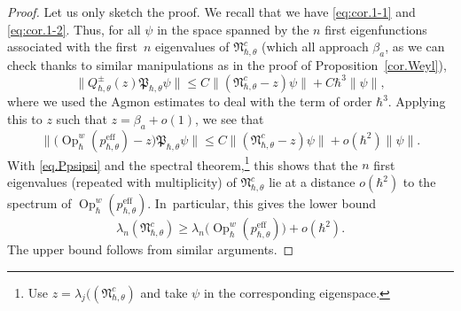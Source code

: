 \documentclass[JEP,XML,SOM,Unicode,NoFloatCountersInSection,published]{cedram}
\newcommand{\eff}{\mathrm{eff}}
\DeclareMathOperator{\Op}{Op}
\theoremstyle{plain}
\theoremstyle{definition}
\begin{document}
\begin{proof}
Let us only sketch the proof. We recall that we have \eqref{eq:cor.1-1} and \eqref{eq:cor.1-2}. Thus, for all $\psi$ in the space spanned by the $n$ first eigenfunctions associated with the first~$n$ eigenvalues of $\mathfrak{N}^c_{\hbar,\theta}$ (which all approach $\beta_a$, as we can check thanks to similar manipulations as in the proof of Proposition~\ref{cor.Weyl}),
\[
\|Q_{\hbar,\theta}^\pm(z)\mathfrak{P}_{\hbar,\theta}\psi\|\leq C\|(\mathfrak{N}_{\hbar,\theta}^c-z)\psi\|+C\hbar^3\|\psi\|,
\]
where we used the Agmon estimates to deal with the term of order $\hbar^3$. Applying this to $z$ such that $z=\beta_a+o(1)$, we see that
\[
\|\bigl(\Op^w_\hbar (p^{\eff}_{\hbar,\theta})-z\bigr)\mathfrak{P}_{\hbar,\theta}\psi\|\leq C\|(\mathfrak{N}_{\hbar,\theta}^c-z)\psi\|+o(\hbar^2)\|\psi\|.
\]
With \eqref{eq.Ppsipsi} and the spectral theorem,\footnote{Use $z=\lambda_j((\mathfrak{N}_{\hbar,\theta}^c)$ and take $\psi$ in the corresponding eigenspace.} this shows that the $n$ first eigenvalues (repea\-ted with multiplicity) of $\mathfrak{N}_{\hbar,\theta}^c$ lie at a distance $o(\hbar^2)$ to the spectrum of $\Op^w_\hbar (p^{\eff}_{\hbar,\theta})$. In~particular, this gives the lower bound
\[
\lambda_n(\mathfrak{N}^c_{\hbar,\theta})\geq\lambda_n\bigl(\Op^w_\hbar (p^{\eff}_{\hbar,\theta})\bigr)+o(\hbar^{2}).
\]
The upper bound follows from similar arguments.
\end{proof}
\end{document}
